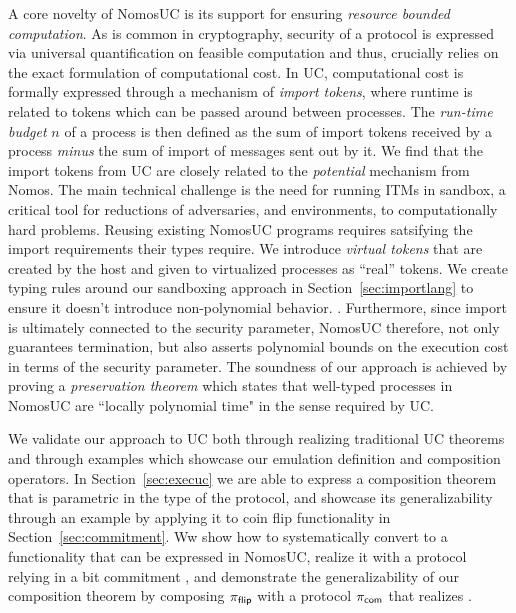A core novelty of NomosUC is its support for ensuring \emph{resource bounded computation}.
As is common in cryptography, security of a protocol is expressed via universal quantification
on feasible computation and thus, crucially relies on the exact formulation of computational cost.
In UC, computational cost is formally expressed through a mechanism of \emph{import tokens}, where runtime is related to tokens which can be passed around between processes.
The \emph{run-time budget} $n$ of a process is then defined as the sum of import tokens received by a process \emph{minus} the sum of import of messages sent out by it.
We find that the import tokens from UC are closely related to the \emph{potential} mechanism from Nomos.
The main technical challenge is the need for running ITMs in sandbox, a critical tool for reductions of adversaries, and environments, to computationally hard problems.
Reusing existing NomosUC programs requires satsifying the import requirements their types require.
We introduce \emph{virtual tokens} that are created by the host and given to virtualized processes as ``real'' tokens. 
We create typing rules around our sandboxing approach in Section~\ref{sec:importlang} to ensure it doesn't introduce non-polynomial behavior.
.
Furthermore, since import is ultimately connected to the security parameter, NomosUC
therefore, not only guarantees termination, but also asserts polynomial bounds on
the execution cost in terms of the security parameter.
The soundness of our approach is achieved by proving a \emph{preservation theorem}
which states that well-typed processes in NomosUC are ``locally polynomial time"
in the sense required by UC.

We validate our approach to UC both through realizing traditional UC theorems and through examples which showcase our emulation definition and composition operators.
In Section~\ref{sec:execuc} we are able to express a composition theorem that is parametric in the type of the protocol, and showcase its generalizability through an example 
by applying it to coin flip functionality \Fflip in Section~\ref{sec:commitment}.
Ww show how to systematically convert \Fflip to a functionality that can be expressed in NomosUC, realize it with a protocol relying in a bit commitment \Fcom, and demonstrate the generalizability of our composition theorem by composing $\pi_{\mathsf{flip}}$ with a protocol $\pi_{\mathsf{com}}$ that realizes \Fcom.  

